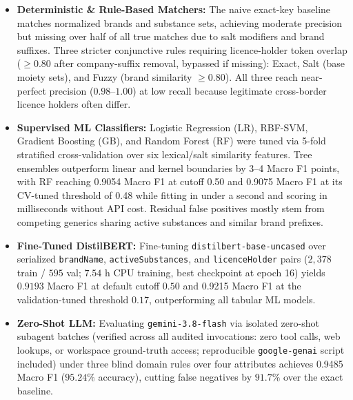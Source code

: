 \documentclass{llncs}
\begin{document}
\begin{itemize}
  \item \textbf{Deterministic \& Rule-Based Matchers:} The naive exact-key baseline matches normalized brands and substance sets, achieving moderate precision but missing over half of all true matches due to salt modifiers and brand suffixes. Three stricter conjunctive rules requiring licence-holder token overlap ($\ge 0.80$ after company-suffix removal, bypassed if missing): Exact, Salt (base moiety sets), and Fuzzy (brand similarity $\ge 0.80$). All three reach near-perfect precision ($0.98$--$1.00$) at low recall because legitimate cross-border licence holders often differ.
  \item \textbf{Supervised ML Classifiers:} Logistic Regression (LR), RBF-SVM, Gradient Boosting (GB), and Random Forest (RF) were tuned via 5-fold stratified cross-validation over six lexical/salt similarity features. Tree ensembles outperform linear and kernel boundaries by 3--4 Macro F1 points, with RF reaching 0.9054 Macro F1 at cutoff 0.50 and 0.9075 Macro F1 at its CV-tuned threshold of 0.48 while fitting in under a second and scoring in milliseconds without API cost. Residual false positives mostly stem from competing generics sharing active substances and similar brand prefixes.
  \item \textbf{Fine-Tuned DistilBERT:} Fine-tuning \texttt{distilbert-base-uncased} over serialized \texttt{brandName}, \texttt{activeSubstances}, and \texttt{licenceHolder} pairs ($2{,}378$ train / $595$ val; $7.54\text{ h}$ CPU training, best checkpoint at epoch 16) yields $0.9193$ Macro F1 at default cutoff $0.50$ and 0.9215 Macro F1 at the validation-tuned threshold $0.17$, outperforming all tabular ML models.
  \item \textbf{Zero-Shot LLM:} Evaluating \texttt{gemini-3.8-flash} via isolated zero-shot subagent batches (verified across all audited invocations: zero tool calls, web lookups, or workspace ground-truth access; reproducible \texttt{google-genai} script included) under three blind domain rules over four attributes achieves 0.9485 Macro F1 ($95.24\%$ accuracy), cutting false negatives by $91.7\%$ over the exact baseline.
\end{itemize}
\end{document}
